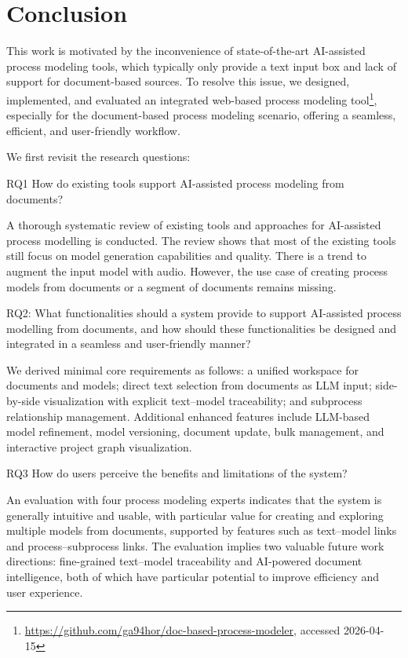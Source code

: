 \FloatBarrier
\chapter{Conclusion}
\label{sec:conclusion}
This work is motivated by the inconvenience of state-of-the-art AI-assisted process modeling tools, which typically only provide a text input box and lack of support for document-based sources. To resolve this issue, we designed, implemented, and evaluated an integrated web-based process modeling tool\footnote{\url{https://github.com/ga94hor/doc-based-process-modeler}, accessed 2026-04-15}, especially for the document-based process modeling scenario, offering a seamless, efficient, and user-friendly workflow.

We first revisit the research questions:

RQ1 How do existing tools support AI-assisted process modeling from documents?

A thorough systematic review of existing tools and approaches for AI-assisted process modelling is conducted. The review shows that most of the existing tools still focus on model generation capabilities and quality. There is a trend to augment the input model with audio. However, the use case of creating process models from documents or a segment of documents remains missing.

RQ2: What functionalities should a system provide to support AI-assisted process modelling from documents, and how should these functionalities be designed and integrated in a seamless and user-friendly manner?

We derived minimal core requirements as follows: a unified workspace for documents and models; direct text selection from documents as LLM input; side-by-side visualization with explicit text–model traceability; and subprocess relationship management.
Additional enhanced features include LLM-based model refinement, model versioning, document update, bulk management, and interactive project graph visualization. 


RQ3 How do users perceive the benefits and limitations of the system?

An evaluation with four process modeling experts indicates that the system is generally intuitive and usable, with particular value for creating and exploring multiple models from documents, supported by features such as text–model links and process–subprocess links. The evaluation implies two valuable future work directions: fine-grained text–model traceability and AI-powered document intelligence, both of which have particular potential to improve efficiency and user experience.

